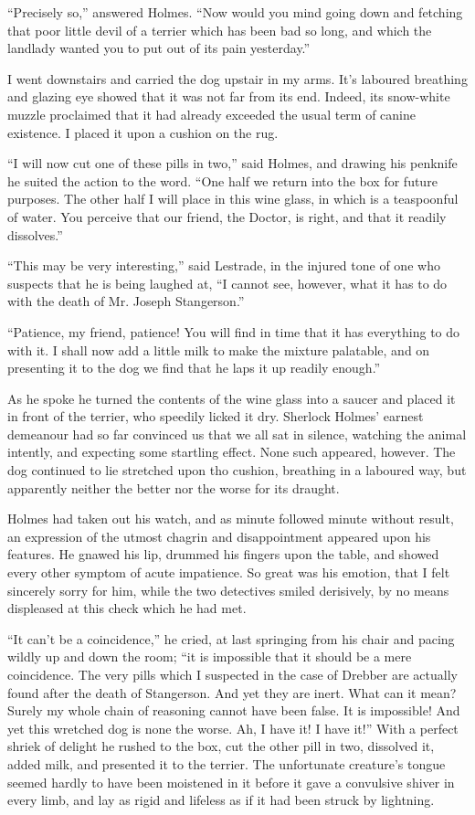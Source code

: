 \documentclass[12pt]{book}
\begin{document}
“Precisely so,” answered Holmes. “Now would you mind going down and fetching that poor little devil of a terrier which has been bad so long, and which the landlady wanted you to put out of its pain yesterday.” 

I went downstairs and carried the dog upstair in my arms. It’s laboured breathing and glazing eye showed that it was not far from its end. Indeed, its snow-white muzzle proclaimed that it had already exceeded the usual term of canine existence. I placed it upon a cushion on the rug. 

“I will now cut one of these pills in two,” said Holmes, and drawing his penknife he suited the action to the word. “One half we return into the box for future purposes. The other half I will place in this wine glass, in which is a teaspoonful of water. You perceive that our friend, the Doctor, is right, and that it readily dissolves.” 

“This may be very interesting,” said Lestrade, in the injured tone of one who suspects that he is being laughed at, “I cannot see, however, what it has to do with the death of Mr. Joseph Stangerson.” 

“Patience, my friend, patience! You will find in time that it has everything to do with it. I shall now add a little milk to make the mixture palatable, and on presenting it to the dog we find that he laps it up readily enough.” 

As he spoke he turned the contents of the wine glass into a saucer and placed it in front of the terrier, who speedily licked it dry. Sherlock Holmes’ earnest demeanour had so far convinced us that we all sat in silence, watching the animal intently, and expecting some startling effect. None such appeared, however. The dog continued to lie stretched upon tho cushion, breathing in a laboured way, but apparently neither the better nor the worse for its draught. 

Holmes had taken out his watch, and as minute followed minute without result, an expression of the utmost chagrin and disappointment appeared upon his features. He gnawed his lip, drummed his fingers upon the table, and showed every other symptom of acute impatience. So great was his emotion, that I felt sincerely sorry for him, while the two detectives smiled derisively, by no means displeased at this check which he had met. 

“It can’t be a coincidence,” he cried, at last springing from his chair and pacing wildly up and down the room; “it is impossible that it should be a mere coincidence. The very pills which I suspected in the case of Drebber are actually found after the death of Stangerson. And yet they are inert. What can it mean? Surely my whole chain of reasoning cannot have been false. It is impossible! And yet this wretched dog is none the worse. Ah, I have it! I have it!” With a perfect shriek of delight he rushed to the box, cut the other pill in two, dissolved it, added milk, and presented it to the terrier. The unfortunate creature’s tongue seemed hardly to have been moistened in it before it gave a convulsive shiver in every limb, and lay as rigid and lifeless as if it had been struck by lightning. 
\end{document}
